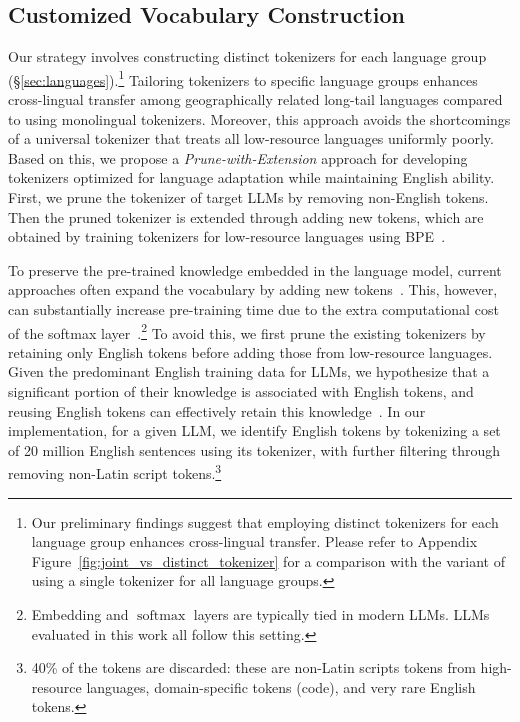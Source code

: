 \subsection{Customized Vocabulary Construction}\label{sec:vocab_construct}
Our strategy involves constructing distinct tokenizers for each language group (\S\ref{sec:languages}).\footnote{Our preliminary findings suggest that employing distinct tokenizers for each language group enhances cross-lingual transfer. Please refer to Appendix Figure~\ref{fig:joint_vs_distinct_tokenizer} for a comparison with the variant of using a single tokenizer for all language groups.} Tailoring tokenizers to specific language groups enhances cross-lingual transfer among geographically related long-tail languages compared to using monolingual tokenizers. Moreover, this approach avoids the shortcomings of a universal tokenizer that treats all low-resource languages uniformly poorly. Based on this, we propose a \emph{Prune-with-Extension} approach for developing tokenizers optimized for language adaptation while maintaining English ability. 
First, we prune the tokenizer of target LLMs by removing non-English tokens. Then the pruned tokenizer is extended through adding new tokens, which are obtained by training tokenizers for low-resource languages using BPE~\citep{bpe,sennrich-etal-2016-neural}.

To preserve the pre-trained knowledge embedded in the language model, current approaches often expand the vocabulary by adding new tokens~\citep{fujii2024continual, cui2024efficienteffectivetextencoding}. This, however, can substantially increase pre-training time due to the extra computational cost of the softmax layer~\citep{liang-etal-2023-xlm}.\footnote{Embedding and $\operatorname{softmax}$ layers are typically tied in modern LLMs. LLMs evaluated in this work all follow this setting.} 
To avoid this, we first prune the existing tokenizers by retaining only English tokens before adding those from low-resource languages.
Given the predominant English training data for LLMs, we hypothesize that a significant portion of their knowledge is associated with English tokens, and reusing English tokens can effectively retain this knowledge~\citep{garcia-etal-2021-towards}. 
In our implementation, for a given LLM, we identify English tokens by tokenizing a set of 20 million English sentences using its tokenizer, with further filtering through removing non-Latin script tokens.\footnote{40\% of the tokens are discarded: these are non-Latin scripts tokens from high-resource languages, domain-specific tokens (\eg code), and very rare English tokens.}

